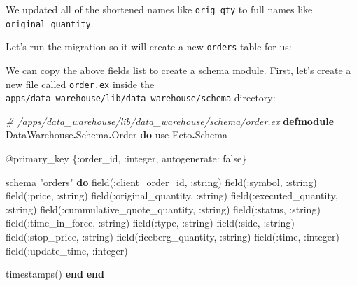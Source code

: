 \documentclass[
  oneside]{book}
\newenvironment{Shaded}{\begin{snugshade}}{\end{snugshade}}
\newcommand{\CommentTok}[1]{\textcolor[rgb]{0.56,0.35,0.01}{\textit{#1}}}
\newcommand{\ConstantTok}[1]{\textcolor[rgb]{0.00,0.00,0.00}{#1}}
\newcommand{\ExtensionTok}[1]{#1}
\newcommand{\ImportTok}[1]{#1}
\newcommand{\KeywordTok}[1]{\textcolor[rgb]{0.13,0.29,0.53}{\textbf{#1}}}
\newcommand{\NormalTok}[1]{#1}
\newcommand{\OperatorTok}[1]{\textcolor[rgb]{0.81,0.36,0.00}{\textbf{#1}}}
\newcommand{\OtherTok}[1]{\textcolor[rgb]{0.56,0.35,0.01}{#1}}
\newcommand{\StringTok}[1]{\textcolor[rgb]{0.31,0.60,0.02}{#1}}
\newcommand{\VariableTok}[1]{\textcolor[rgb]{0.00,0.00,0.00}{#1}}
\begin{document}
We updated all of the shortened names like \texttt{orig\_qty} to full names like \texttt{original\_quantity}.

Let's run the migration so it will create a new \texttt{orders} table for us:

\begin{Shaded}
\end{Shaded}

We can copy the above fields list to create a schema module. First, let's create a new file called \texttt{order.ex} inside the \texttt{apps/data\_warehouse/lib/data\_warehouse/schema} directory:

\begin{Shaded}
\begin{Highlighting}[]
\CommentTok{\# /apps/data\_warehouse/lib/data\_warehouse/schema/order.ex}
\KeywordTok{defmodule} \ConstantTok{DataWarehouse}\OperatorTok{.}\ConstantTok{Schema}\OperatorTok{.}\ConstantTok{Order} \KeywordTok{do}
  \ImportTok{use} \ConstantTok{Ecto}\OperatorTok{.}\ConstantTok{Schema}

  \OtherTok{@primary\_key}\NormalTok{ \{}\VariableTok{:order\_id}\NormalTok{, }\VariableTok{:integer}\NormalTok{, }\VariableTok{autogenerate:} \ConstantTok{false}\NormalTok{\}}

\NormalTok{  schema }\StringTok{"orders"} \KeywordTok{do}
\NormalTok{    field(}\VariableTok{:client\_order\_id}\NormalTok{, }\VariableTok{:string}\NormalTok{)}
\NormalTok{    field(}\VariableTok{:symbol}\NormalTok{, }\VariableTok{:string}\NormalTok{)}
\NormalTok{    field(}\VariableTok{:price}\NormalTok{, }\VariableTok{:string}\NormalTok{)}
\NormalTok{    field(}\VariableTok{:original\_quantity}\NormalTok{, }\VariableTok{:string}\NormalTok{)}
\NormalTok{    field(}\VariableTok{:executed\_quantity}\NormalTok{, }\VariableTok{:string}\NormalTok{)}
\NormalTok{    field(}\VariableTok{:cummulative\_quote\_quantity}\NormalTok{, }\VariableTok{:string}\NormalTok{)}
\NormalTok{    field(}\VariableTok{:status}\NormalTok{, }\VariableTok{:string}\NormalTok{)}
\NormalTok{    field(}\VariableTok{:time\_in\_force}\NormalTok{, }\VariableTok{:string}\NormalTok{)}
\NormalTok{    field(}\VariableTok{:type}\NormalTok{, }\VariableTok{:string}\NormalTok{)}
\NormalTok{    field(}\VariableTok{:side}\NormalTok{, }\VariableTok{:string}\NormalTok{)}
\NormalTok{    field(}\VariableTok{:stop\_price}\NormalTok{, }\VariableTok{:string}\NormalTok{)}
\NormalTok{    field(}\VariableTok{:iceberg\_quantity}\NormalTok{, }\VariableTok{:string}\NormalTok{)}
\NormalTok{    field(}\VariableTok{:time}\NormalTok{, }\VariableTok{:integer}\NormalTok{)}
\NormalTok{    field(}\VariableTok{:update\_time}\NormalTok{, }\VariableTok{:integer}\NormalTok{)}

\NormalTok{    timestamps()}
  \KeywordTok{end}
\KeywordTok{end}
\end{Highlighting}
\end{Shaded}
\end{document}
